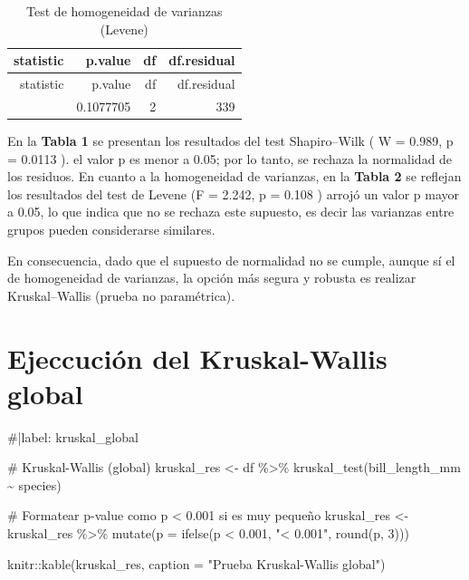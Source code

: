\documentclass[
  spanish,
  11pt,
  a4paper,
  DIV=11,
  numbers=noendperiod]{scrartcl}
\newenvironment{Shaded}{\begin{snugshade}}{\end{snugshade}}
\newcommand{\AttributeTok}[1]{\textcolor[rgb]{0.40,0.45,0.13}{#1}}
\newcommand{\CommentTok}[1]{\textcolor[rgb]{0.37,0.37,0.37}{#1}}
\newcommand{\DecValTok}[1]{\textcolor[rgb]{0.68,0.00,0.00}{#1}}
\newcommand{\FloatTok}[1]{\textcolor[rgb]{0.68,0.00,0.00}{#1}}
\newcommand{\FunctionTok}[1]{\textcolor[rgb]{0.28,0.35,0.67}{#1}}
\newcommand{\NormalTok}[1]{\textcolor[rgb]{0.00,0.23,0.31}{#1}}
\newcommand{\OtherTok}[1]{\textcolor[rgb]{0.00,0.23,0.31}{#1}}
\newcommand{\SpecialCharTok}[1]{\textcolor[rgb]{0.37,0.37,0.37}{#1}}
\newcommand{\StringTok}[1]{\textcolor[rgb]{0.13,0.47,0.30}{#1}}
\begin{document}
\begin{longtable}[]{@{}rrrr@{}}
\caption{Test de homogeneidad de varianzas (Levene)}\tabularnewline
\toprule\noalign{}
statistic & p.value & df & df.residual \\
\midrule\noalign{}
\endfirsthead
\toprule\noalign{}
statistic & p.value & df & df.residual \\
\midrule\noalign{}
\endhead
\bottomrule\noalign{}
\endlastfoot
2.242456 & 0.1077705 & 2 & 339 \\
\end{longtable}

En la \textbf{Tabla 1} se presentan los resultados del test
Shapiro--Wilk ( W = 0.989, p = 0.0113 ). el valor p es menor a 0.05; por
lo tanto, se rechaza la normalidad de los residuos. En cuanto a la
homogeneidad de varianzas, en la \textbf{Tabla 2} se reflejan los
resultados del test de Levene (F = 2.242, p = 0.108 ) arrojó un valor p
mayor a 0.05, lo que indica que no se rechaza este supuesto, es decir
las varianzas entre grupos pueden considerarse similares.

En consecuencia, dado que el supuesto de normalidad no se cumple, aunque
sí el de homogeneidad de varianzas, la opción más segura y robusta es
realizar Kruskal--Wallis (prueba no paramétrica).

\section{Ejeccución del Kruskal-Wallis
global}\label{ejeccuciuxf3n-del-kruskal-wallis-global}

\begin{Shaded}
\begin{Highlighting}[numbers=left,,]
\CommentTok{\#|label: kruskal\_global}

\CommentTok{\# Kruskal{-}Wallis (global)}
\NormalTok{kruskal\_res }\OtherTok{\textless{}{-}}\NormalTok{ df }\SpecialCharTok{\%\textgreater{}\%} \FunctionTok{kruskal\_test}\NormalTok{(bill\_length\_mm }\SpecialCharTok{\textasciitilde{}}\NormalTok{ species)}

\CommentTok{\# Formatear p{-}value como p \textless{} 0.001 si es muy pequeño}
\NormalTok{kruskal\_res }\OtherTok{\textless{}{-}}\NormalTok{ kruskal\_res }\SpecialCharTok{\%\textgreater{}\%}
  \FunctionTok{mutate}\NormalTok{(}\AttributeTok{p =} \FunctionTok{ifelse}\NormalTok{(p }\SpecialCharTok{\textless{}} \FloatTok{0.001}\NormalTok{, }\StringTok{"\textless{} 0.001"}\NormalTok{, }\FunctionTok{round}\NormalTok{(p, }\DecValTok{3}\NormalTok{)))}

\NormalTok{knitr}\SpecialCharTok{::}\FunctionTok{kable}\NormalTok{(kruskal\_res, }\AttributeTok{caption =} \StringTok{"Prueba Kruskal{-}Wallis global"}\NormalTok{)}
\end{Highlighting}
\end{Shaded}
\end{document}
